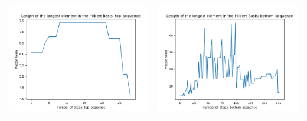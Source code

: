 \documentclass[10pt]{article}
\begin{document}
\begin{tabular}{c|c}
\begin{minipage}{.45\textwidth}
\includegraphics[width=\textwidth]{"DATA/5d/5 generators 2 bound C/top_sequence LENGTH"}
\end{minipage} &
\begin{minipage}{.45\textwidth}
\includegraphics[width=\textwidth]{"DATA/5d/5 generators 2 bound C bottomup/bottom_sequence LENGTH"}
\end{minipage}
\end{tabular}
\end{document}
